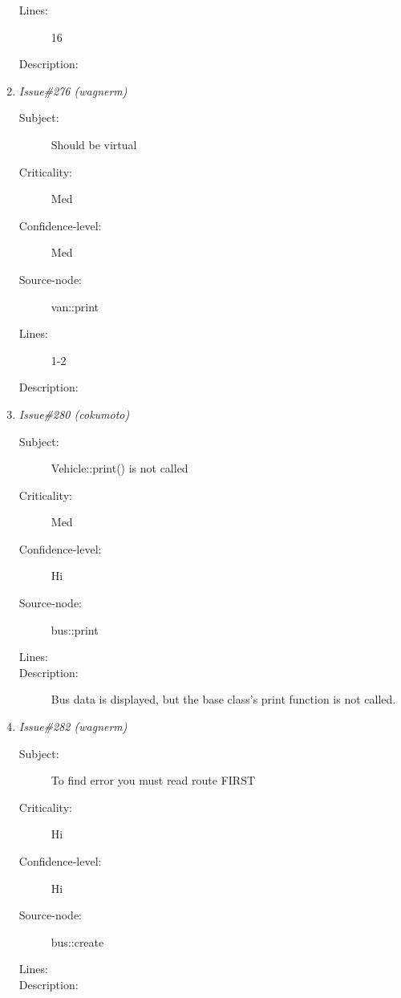 \begin{enumerate}
\begin{description}
\item [Lines:] 16

\item [Description:] 
\end{description}
\item {\it Issue\#276 (wagnerm)}
\begin{description}
\item [Subject:] Should be virtual
\item [Criticality:] Med
\item [Confidence-level:] Med
\item [Source-node:] van::print

\item [Lines:] 1-2

\item [Description:] 
\end{description}
\item {\it Issue\#280 (cokumoto)}
\begin{description}
\item [Subject:] Vehicle::print() is not called
\item [Criticality:] Med
\item [Confidence-level:] Hi
\item [Source-node:] bus::print

\item [Lines:] 

\item [Description:] Bus data is displayed, but the base class's
print function is not called.
\end{description}
\item {\it Issue\#282 (wagnerm)}
\begin{description}
\item [Subject:] To find error you must read route FIRST
\item [Criticality:] Hi
\item [Confidence-level:] Hi
\item [Source-node:] bus::create

\item [Lines:] 

\item [Description:] 
\end{description}
\end{enumerate}

